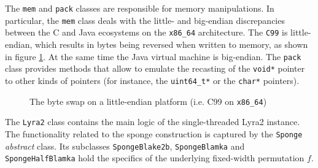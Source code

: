 The \texttt{mem} and \texttt{pack} classes are responsible for memory manipulations. In particular, the \texttt{mem} class deals with the little- and big-endian discrepancies between the C and Java ecosystems on the \texttt{x86\_64} architecture. The \texttt{C99} is little-endian, which results in bytes being reversed when written to memory, as shown in figure \ref{fig:little-endian}. At the same time the Java virtual machine is big-endian. The \texttt{pack} class provides methods that allow to emulate the recasting of the \texttt{void*} pointer to other kinds of pointers (for instance, the \texttt{uint64\_t*} or the \texttt{char*} pointers).

\begin{figure}
    \centering
    \caption{The byte swap on a little-endian platform (i.e. C99 on \texttt{x86\_64})}
    \label{fig:little-endian}
  \end{figure}

The \texttt{Lyra2} class contains the main logic of the single-threaded Lyra2 instance. The functionality related to the sponge construction is captured by the \texttt{Sponge} \emph{abstract} class. Its subclasses \texttt{SpongeBlake2b}, \texttt{SpongeBlamka} and \texttt{SpongeHalfBlamka} hold the specifics of the underlying fixed-width permutation \(f\).

